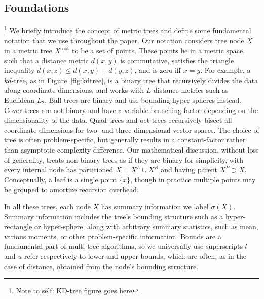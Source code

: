 \documentclass[twoside,leqno,twocolumn]{article}
\newcommand{\authornote}[1]{\footnote{Note to self: #1}}
\newcommand{\union}{\cup}
\newcommand{\fig}[1]{Figure~\ref{fig:#1}}
\newcommand{\mysub}[1]{\subsection{#1} }
\newcommand{\kdroot}[1]{#1^{\text{root}}}
\newcommand{\kdleft}[1]{#1^{\!L}}
\newcommand{\kdright}[1]{#1^{\!R}}
\newcommand{\kdparent}[1]{#1^{\!P}}
\newcommand{\dist}[2]{d(#1,#2)}
\newcommand{\outstat}{\sigma}
\begin{document}
\mysub{Foundations}
\authornote{KD-tree figure goes here}
We briefly introduce the concept of metric trees and define some fundamental notation that we use throughout the paper.
Our notation considers tree node $X$ in a metric tree $\kdroot{X}$ to be a set of points.
These points lie in a metric space, such that a distance metric $\dist{x}{y}$ is commutative, satisfies the triangle inequality $\dist{x}{z} \leq \dist{x}{y} + \dist{y}{z}$, and is zero iff $x = y$.
For example, a $kd$-tree\cite{preparata_kdtrees}, as in \fig{kdtree}, is a binary tree that recursively divides the data along coordinate dimensions, and works with $L$ distance metrics such as Euclidean $L_2$.
Ball trees are binary and use bounding hyper-spheres instead.
Cover trees are not binary and have a variable branching factor depending on the dimensionality of the data.
Quad-trees and oct-trees recursively bisect all coordinate dimensions for two- and three-dimensional vector spaces.
The choice of tree is often problem-specific, but generally results in a constant-factor rather than asymptotic complexity difference.
Our mathematical discussion, without loss of generality, treats non-binary trees as if they are binary for simplicity, with every internal node has partitioned $X = \kdleft{X} \union \kdright{X}$ and having parent $\kdparent{X} \supset X$.
Conceptually, a leaf is a single point $\{x\}$, though in practice multiple points may be grouped to amortize recursion overhead.

In all these trees, each node $X$ has summary information we label $\outstat(X)$.
Summary information includes the tree's bounding structure such as a hyper-rectangle or hyper-sphere, along with arbitrary summary statistics, such as mean, various moments, or other problem-specific information.
Bounds are a fundamental part of multi-tree algorithms, so we universally use superscripts $l$ and $u$ refer respectively to lower and upper bounds, which are often, as in the case of distance, obtained from the node's bounding structure.
\end{document}
